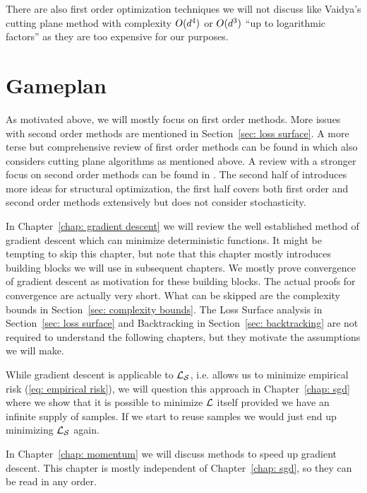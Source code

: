 There are also first order optimization techniques we will not discuss like
Vaidya's cutting plane method
\parencite[e.g.][]{bubeckConvexOptimizationAlgorithms2015} with complexity
\(O(d^4)\) or \(O(d^3)\) ``up to logarithmic factors''
\parencite[Section 2.3]{bubeckConvexOptimizationAlgorithms2015} as they are
too expensive for our purposes.

\section{Gameplan}

As motivated above, we will mostly focus on first order methods. More
issues with second order methods are mentioned in Section~\ref{sec: loss
surface}. A more terse but comprehensive review of first order methods can be found in
\textcite{bubeckConvexOptimizationAlgorithms2015} which also considers cutting
plane algorithms as mentioned above. A review with a stronger focus on second
order methods can be found in
\textcite{bottouOptimizationMethodsLargeScale2018}. The second half of
\textcite{nesterovLecturesConvexOptimization2018} introduces more ideas for
structural optimization, the first half covers both first order and second
order methods extensively but does not consider stochasticity.

In Chapter~\ref{chap: gradient descent} we will review the well
established method of gradient descent which can minimize deterministic
functions. It might be tempting to skip this chapter, but note that this chapter 
mostly introduces building blocks we will use in subsequent chapters. We mostly
prove convergence of gradient descent as motivation for these building blocks.
The actual proofs for convergence are actually very short. What can be skipped
are the complexity bounds in Section~\ref{sec: complexity bounds}. The
Loss Surface analysis in Section~\ref{sec: loss surface} and Backtracking
in Section~\ref{sec: backtracking} are not required to understand the following
chapters, but they motivate the assumptions we will make.

While gradient descent is applicable to \(\mathcal{L}_{\mathcal{S}}\), i.e. allows us
to minimize empirical risk (\ref{eq: empirical risk}), we will question this
approach in Chapter~\ref{chap: sgd} where we show that it is possible to
minimize \(\mathcal{L}\) itself provided we have an infinite supply of samples. If we
start to reuse samples we would just end up minimizing \(\mathcal{L}_{\mathcal{S}}\) again.

In Chapter~\ref{chap: momentum} we will discuss methods to speed up
gradient descent. This chapter is mostly independent of Chapter~\ref{chap: sgd},
so they can be read in any order.



\endinput
